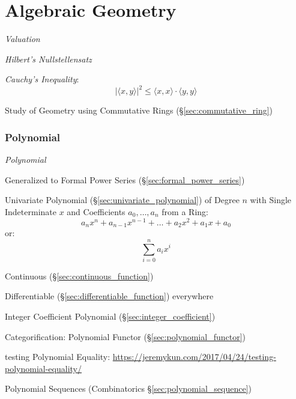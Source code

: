 \part{Algebraic Geometry}\label{part:algebraic_geometry}

\emph{Valuation}

\emph{Hilbert's Nullstellensatz}

\emph{Cauchy's Inequality}:
\[
    |\langle x,y \rangle|^2 \leq \langle x,x \rangle \cdot \langle
    y,y \rangle
\]

Study of Geometry using Commutative Rings
(\S\ref{sec:commutative_ring})



\section{Polynomial}\label{sec:polynomial}

\emph{Polynomial}

Generalized to Formal Power Series (\S\ref{sec:formal_power_series})

Univariate Polynomial (\S\ref{sec:univariate_polynomial}) of Degree
$n$ with Single Indeterminate $x$ and Coefficients $a_0, \ldots, a_n$
from a Ring:
\[
  a_n x^n + a_{n-1} x^{n-1} + \ldots + a_2 x^2 + a_1 x + a_0
\]
or:
\[
  \sum_{i=0}^n a_i x^i
\]

Continuous (\S\ref{sec:continuous_function})

Differentiable (\S\ref{sec:differentiable_function}) everywhere

Integer Coefficient Polynomial (\S\ref{sec:integer_coefficient})

Categorification: Polynomial Functor (\S\ref{sec:polynomial_functor})

testing Polynomial Equality:
\url{https://jeremykun.com/2017/04/24/testing-polynomial-equality/}

\fist Polynomial Sequences (Combinatorics \S\ref{sec:polynomial_sequence})



